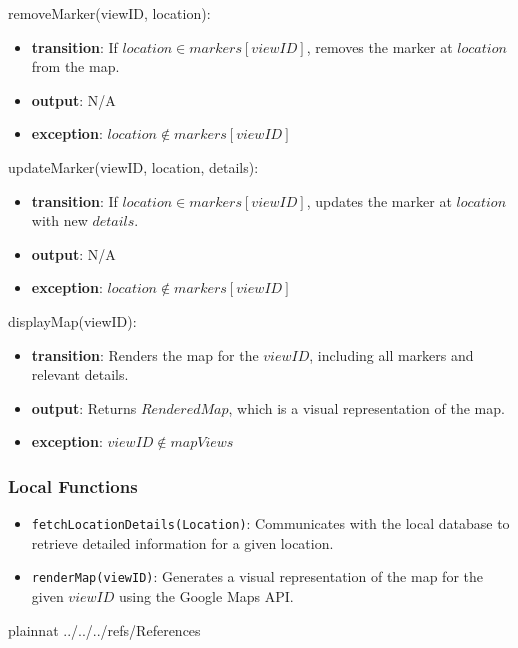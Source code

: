 \documentclass[12pt, titlepage]{article}
\begin{document}
\noindent removeMarker(viewID, location):
\begin{itemize}
  \item \textbf{transition}:
        If \( location \in markers[viewID] \), removes the marker at \( location \) from the map.
  \item \textbf{output}: N/A
  \item \textbf{exception}: \( location \notin markers[viewID] \)
\end{itemize}

\noindent updateMarker(viewID, location, details):
\begin{itemize}
  \item \textbf{transition}:
        If \( location \in markers[viewID] \), updates the marker at \( location \) with new \( details \).
  \item \textbf{output}: N/A
  \item \textbf{exception}: \( location \notin markers[viewID] \)
\end{itemize}

\noindent displayMap(viewID):
\begin{itemize}
  \item \textbf{transition}:
        Renders the map for the \( viewID \), including all markers and relevant details.
  \item \textbf{output}: Returns \( RenderedMap \), which is a visual representation of the map.
  \item \textbf{exception}: \( viewID \notin mapViews \)
\end{itemize}

\subsubsection{Local Functions}

\begin{itemize}
  \item \texttt{fetchLocationDetails(Location)}: Communicates with the local database to retrieve detailed information for a given location.
  \item \texttt{renderMap(viewID)}: Generates a visual representation of the map for the given \( viewID \) using the Google Maps API.
\end{itemize}

\newpage

 {plainnat}
 {../../../refs/References}

\newpage
\end{document}
